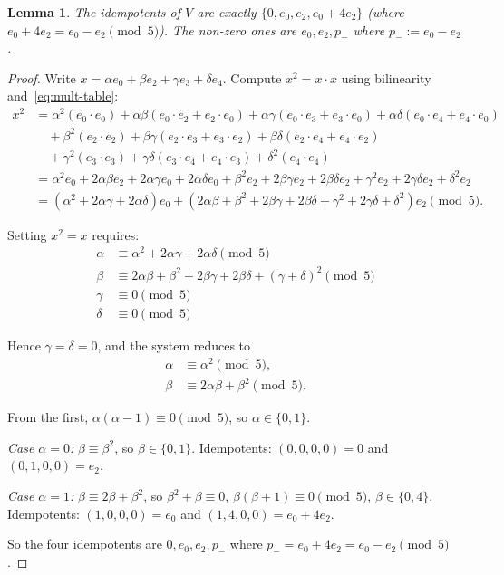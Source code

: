 \documentclass[11pt,reqno]{amsart}
\theoremstyle{plain}
\newtheorem{lemma}[theorem]{Lemma}
\theoremstyle{definition}
\theoremstyle{remark}
\begin{document}
\begin{lemma} \label{lem:idempotents}
The idempotents of $V$ are exactly $\{0, e_0, e_2, e_0 + 4 e_2\}$ (where $e_0 + 4 e_2 = e_0 - e_2 \pmod 5$). The non-zero ones are $e_0, e_2, p_-$ where $p_- := e_0 - e_2$.
\end{lemma}

\begin{proof}
Write $x = \alpha e_0 + \beta e_2 + \gamma e_3 + \delta e_4$. Compute $x^2 = x \cdot x$ using bilinearity and~\eqref{eq:mult-table}:
\begin{align*}
x^2 &= \alpha^2 (e_0 \cdot e_0) + \alpha \beta (e_0 \cdot e_2 + e_2 \cdot e_0) + \alpha \gamma (e_0 \cdot e_3 + e_3 \cdot e_0) + \alpha \delta (e_0 \cdot e_4 + e_4 \cdot e_0) \\
&\quad + \beta^2 (e_2 \cdot e_2) + \beta \gamma (e_2 \cdot e_3 + e_3 \cdot e_2) + \beta \delta (e_2 \cdot e_4 + e_4 \cdot e_2) \\
&\quad + \gamma^2 (e_3 \cdot e_3) + \gamma \delta (e_3 \cdot e_4 + e_4 \cdot e_3) + \delta^2 (e_4 \cdot e_4) \\
&= \alpha^2 e_0 + 2\alpha\beta e_2 + 2\alpha\gamma e_0 + 2\alpha\delta e_0 + \beta^2 e_2 + 2\beta\gamma e_2 + 2\beta\delta e_2 + \gamma^2 e_2 + 2\gamma\delta e_2 + \delta^2 e_2 \\
&= (\alpha^2 + 2\alpha\gamma + 2\alpha\delta) e_0 + (2\alpha\beta + \beta^2 + 2\beta\gamma + 2\beta\delta + \gamma^2 + 2\gamma\delta + \delta^2) e_2 \pmod 5.
\end{align*}

Setting $x^2 = x$ requires:
\begin{align*}
\alpha &\equiv \alpha^2 + 2\alpha\gamma + 2\alpha\delta \pmod 5 \tag{$e_0$ component} \\
\beta &\equiv 2\alpha\beta + \beta^2 + 2\beta\gamma + 2\beta\delta + (\gamma + \delta)^2 \pmod 5 \tag{$e_2$ component} \\
\gamma &\equiv 0 \pmod 5 \tag{$e_3$ component} \\
\delta &\equiv 0 \pmod 5 \tag{$e_4$ component}
\end{align*}

Hence $\gamma = \delta = 0$, and the system reduces to
\begin{align*}
\alpha &\equiv \alpha^2 \pmod 5,\\
\beta &\equiv 2\alpha\beta + \beta^2 \pmod 5.
\end{align*}

From the first, $\alpha(\alpha - 1) \equiv 0 \pmod 5$, so $\alpha \in \{0, 1\}$.

\emph{Case $\alpha = 0$:} $\beta \equiv \beta^2$, so $\beta \in \{0, 1\}$. Idempotents: $(0, 0, 0, 0) = 0$ and $(0, 1, 0, 0) = e_2$.

\emph{Case $\alpha = 1$:} $\beta \equiv 2\beta + \beta^2$, so $\beta^2 + \beta \equiv 0$, $\beta(\beta + 1) \equiv 0 \pmod 5$, $\beta \in \{0, 4\}$. Idempotents: $(1, 0, 0, 0) = e_0$ and $(1, 4, 0, 0) = e_0 + 4 e_2$.

So the four idempotents are $0, e_0, e_2, p_-$ where $p_- = e_0 + 4 e_2 = e_0 - e_2 \pmod 5$.
\end{proof}
\end{document}
